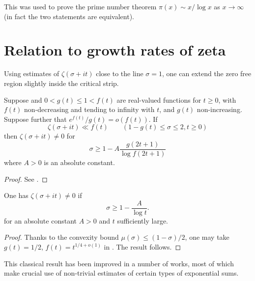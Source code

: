 This was used to prove the prime number theorem $\pi(x) \sim x/\log x$ as $x \to \infty$ (in fact the two statements are equivalent).

\section{Relation to growth rates of zeta}

Using estimates of $\zeta(\sigma + it)$ close to the line $\sigma = 1$, one can extend the zero free region slightly inside the critical strip.

\begin{lemma}\label{mu_to_zero_free}
Suppose and $0 < g(t) \le 1 < f(t)$ are real-valued functions for $t \ge 0$, with $f(t)$ non-decreasing and tending to infinity with $t$, and $g(t)$ non-increasing. Suppose further that $e^{f(t)}/g(t) = o(f(t))$. If
\[
\zeta(\sigma + it) \ll f(t)\qquad (1 - g(t) \le \sigma \le 2, t \ge 0)
\]
then $\zeta(\sigma + it) \ne 0$ for
\[
\sigma \ge 1 - A\frac{g(2t + 1)}{\log f(2t + 1)}
\]
where $A > 0$ is an absolute constant.
\end{lemma}
\begin{proof}
See \cite[Theorem 3.10]{titchmarsh_theory_1986}.
\end{proof}

\begin{theorem}\label{zfr-classical}
One has $\zeta(\sigma + it) \ne 0$ if
\[
\sigma \ge 1 - \frac{A}{\log t}.
\]
for an absolute constant $A > 0$ and $t$ sufficiently large.
\end{theorem}
\begin{proof}
Thanks to the convexity bound $\mu(\sigma) \le (1-\sigma)/2$, one may take $g(t) = 1/2$, $f(t) = t^{1/4 + o(1)}$ in . The result follows.
\end{proof}

This classical result has been improved in a number of works, most of which make crucial use of non-trivial estimates of certain types of exponential sums.

